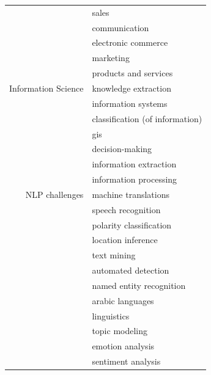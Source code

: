 \begin{center}
\begin{longtable}{ rl }
                                & sales                           \\
                                & communication                   \\
                                & electronic commerce             \\
                                & marketing                       \\
                                & products and services           \\
        Information Science     & knowledge extraction            \\
                                & information systems             \\
                                & classification (of information) \\
                                & gis                             \\
                                & decision-making                 \\
                                & information extraction          \\
                                & information processing          \\
        NLP challenges          & machine translations            \\
                                & speech recognition              \\
                                & polarity classification         \\
                                & location inference              \\
                                & text mining                     \\
                                & automated detection             \\
                                & named entity recognition        \\
                                & arabic languages                \\
                                & linguistics                     \\
                                & topic modeling                  \\
                                & emotion analysis                \\
                                & sentiment analysis              \\

\end{longtable}
\end{center}
